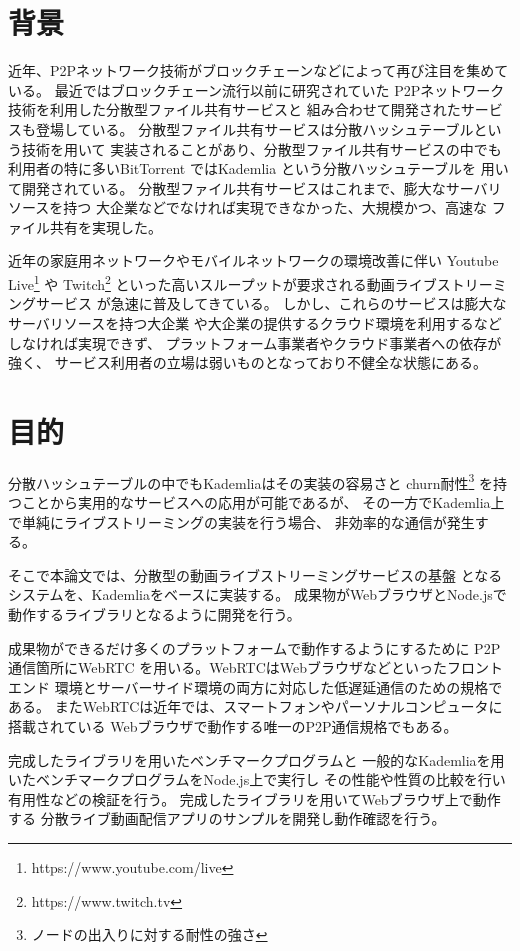 \documentclass[sotsuron]{jcsie}
\begin{document}
\section{背景}
近年、P2Pネットワーク技術がブロックチェーンなどによって再び注目を集めている。
最近ではブロックチェーン流行以前に研究されていた
P2Pネットワーク技術を利用した分散型ファイル共有サービスと
組み合わせて開発されたサービスも登場している。
\cite{BitTorre1:online}
分散型ファイル共有サービスは分散ハッシュテーブルという技術を用いて
実装されることがあり、分散型ファイル共有サービスの中でも
利用者の特に多いBitTorrent\cite{BitTorre59:online}
ではKademlia\cite{maymounkov2002kademlia}\cite{高野祐輝2010nat}
という分散ハッシュテーブルを
用いて開発されている。
分散型ファイル共有サービスはこれまで、膨大なサーバリソースを持つ
大企業などでなければ実現できなかった、大規模かつ、高速な
ファイル共有を実現した。

近年の家庭用ネットワークやモバイルネットワークの環境改善に伴い
Youtube Live\footnote{https://www.youtube.com/live} や 
Twitch\footnote{https://www.twitch.tv} 
といった高いスループットが要求される動画ライブストリーミングサービス
が急速に普及してきている。
しかし、これらのサービスは膨大なサーバリソースを持つ大企業
や大企業の提供するクラウド環境を利用するなどしなければ実現できず、
プラットフォーム事業者やクラウド事業者への依存が強く、
サービス利用者の立場は弱いものとなっており不健全な状態にある。

\section{目的}
分散ハッシュテーブルの中でもKademliaはその実装の容易さと
churn耐性\footnote{ノードの出入りに対する耐性の強さ}
を持つことから実用的なサービスへの応用が可能であるが、
その一方でKademlia上で単純にライブストリーミングの実装を行う場合、
非効率的な通信が発生する。

そこで本論文では、分散型の動画ライブストリーミングサービスの基盤
となるシステムを、Kademliaをベースに実装する。
成果物がWebブラウザとNode.jsで動作するライブラリとなるように開発を行う。

成果物ができるだけ多くのプラットフォームで動作するようにするために
P2P通信箇所にWebRTC \cite{WebRTCHo80:online}
を用いる。WebRTCはWebブラウザなどといったフロントエンド
環境とサーバーサイド環境の両方に対応した低遅延通信のための規格である。
またWebRTCは近年では、スマートフォンやパーソナルコンピュータに搭載されている
Webブラウザで動作する唯一のP2P通信規格でもある。

完成したライブラリを用いたベンチマークプログラムと
一般的なKademliaを用いたベンチマークプログラムをNode.js上で実行し
その性能や性質の比較を行い有用性などの検証を行う。
完成したライブラリを用いてWebブラウザ上で動作する
分散ライブ動画配信アプリのサンプルを開発し動作確認を行う。
\end{document}
